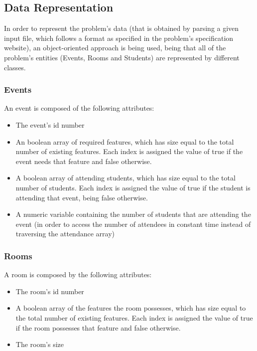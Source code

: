 \documentclass[conference]{IEEEtran}
\begin{document}
\subsection{Data Representation}

In order to represent the problem's data (that is obtained by parsing a given input file, which follows a format as specified in the problem's specification website), an object-oriented approach is being used, being that all of the problem's entities (Events, Rooms and Students) are represented by different classes.

\subsubsection{Events}

An event is composed of the following attributes:
\begin{itemize}
    \item The event's id number
    \item An boolean array of required features, which has size equal to the total number of existing features. Each index is assigned the value of true if the event needs that feature and false otherwise.
    \item A boolean array of attending students, which has size equal to the total number of students. Each index is assigned the value of true if the student is attending that event, being false otherwise.
    \item A numeric variable containing the number of students that are attending the event (in order to access the number of attendees in constant time instead of traversing the attendance array)
\end{itemize}

\subsubsection{Rooms}

A room is composed by the following attributes:
\begin{itemize}
    \item The room's id number
    \item A boolean array of the features the room possesses, which has size equal to the total number of existing features. Each index is assigned the value of true if the room possesses that feature and false otherwise.
    \item The room's size
\end{itemize}
\end{document}
